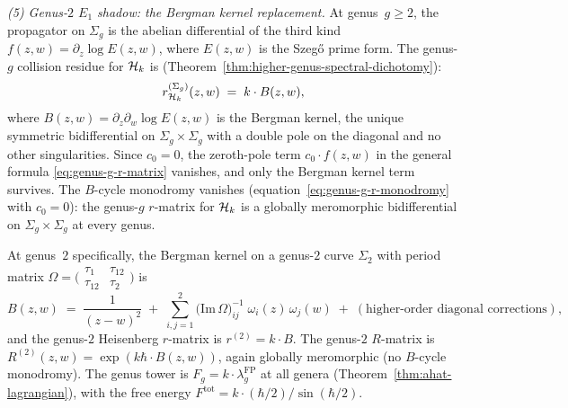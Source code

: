 \begin{computation}
\smallskip
\noindent
\emph{(5) Genus-$2$ $E_1$ shadow: the Bergman kernel replacement.}
At genus~$g \ge 2$, the propagator on $\Sigma_g$ is the abelian
differential of the third kind $f(z,w) = \partial_z \log E(z,w)$,
where $E(z,w)$ is the Szeg\H{o} prime form. The genus-$g$
collision residue for $\mathcal{H}_k$ is
(Theorem~\ref{thm:higher-genus-spectral-dichotomy}):
\begin{equation}\label{eq:e1-genus-g-r}
r^{(\Sigma_g)}_{\mathcal{H}_k}(z,w)
\;=\;
k \cdot B(z,w),
\end{equation}
where $B(z,w) = \partial_z \partial_w \log E(z,w)$ is the
Bergman kernel, the unique symmetric bidifferential on
$\Sigma_g \times \Sigma_g$ with a double pole on the diagonal
and no other singularities. Since $c_0 = 0$, the zeroth-pole
term $c_0 \cdot f(z,w)$ in the general formula
\eqref{eq:genus-g-r-matrix} vanishes, and only the Bergman
kernel term survives. The $B$-cycle monodromy vanishes
(equation~\eqref{eq:genus-g-r-monodromy} with $c_0 = 0$):
the genus-$g$ $r$-matrix for $\mathcal{H}_k$ is a globally meromorphic
bidifferential on $\Sigma_g \times \Sigma_g$ at every genus.

At genus~$2$ specifically, the Bergman kernel on a genus-$2$ curve
$\Sigma_2$ with period matrix $\Omega = \bigl(\begin{smallmatrix}
\tau_1 & \tau_{12} \\ \tau_{12} & \tau_2
\end{smallmatrix}\bigr)$ is
\[
B(z,w)
\;=\;
\frac{1}{(z-w)^2}
\;+\;
\sum_{i,j=1}^{2}
\bigl(\mathrm{Im}\,\Omega\bigr)^{-1}_{ij}\;
\omega_i(z)\,\omega_j(w)
\;+\;
(\text{higher-order diagonal corrections}),
\]
and the genus-$2$ Heisenberg $r$-matrix is $r^{(2)} = k \cdot B$.
The genus-$2$ $R$-matrix is $R^{(2)}(z,w) = \exp(k\hbar\cdot B(z,w))$,
again globally meromorphic (no $B$-cycle monodromy). The genus tower
is $F_g = k \cdot \lambda_g^{\mathrm{FP}}$ at all genera (Theorem~\ref{thm:ahat-lagrangian}), with the free energy
$F^{\mathrm{tot}} = k \cdot (\hbar/2)/\sin(\hbar/2)$.


\end{computation}
